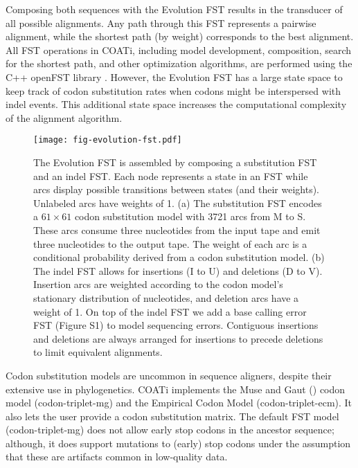 Composing both sequences with the Evolution FST results in the transducer of all possible alignments.
Any path through this FST represents a pairwise alignment, while the shortest path (by weight) corresponds to the best alignment.
All FST operations in COATi, including model development, composition, search for the shortest path, and other optimization algorithms, are performed using the C++ openFST library .
However, the Evolution FST has a large state space to keep track of codon substitution rates when codons might be interspersed with indel events. This additional state space increases the computational complexity of the alignment algorithm.

\begin{figure}[h!]
\centering
\texttt{[image: fig-evolution-fst.pdf]}
\par
\caption{The Evolution FST is assembled by composing a substitution FST and an indel FST.
Each node represents a state in an FST while arcs display possible transitions between states (and their weights). Unlabeled arcs have weights of 1.
(a) The substitution FST encodes a $61 \times 61 $ codon substitution model with 3721 arcs from M to S. These arcs consume three nucleotides from the input tape and emit three nucleotides to the output tape. The weight of each arc is a conditional probability derived from a codon substitution model.
(b) The indel FST allows for insertions (I to U) and deletions (D to V). Insertion arcs are weighted according to the codon model's stationary distribution of nucleotides, and deletion arcs have a weight of 1. On top of the indel FST we add a base calling error FST (Figure S1) to model sequencing errors. Contiguous insertions and deletions are always arranged for insertions to precede deletions to limit equivalent alignments.}
\label{fig:evolution-fst}
\end{figure}

Codon substitution models are uncommon in sequence aligners, despite their extensive use in phylogenetics.
COATi implements the Muse and Gaut (\citeyear{muse_gaut_1994}) codon model (codon-triplet-mg) and the Empirical Codon Model  (codon-triplet-ecm).
It also lets the user provide a codon substitution matrix.
The default FST model (codon-triplet-mg) does not allow early stop codons in the ancestor sequence; although, it does support mutations to (early) stop codons under the assumption that these are artifacts common in low-quality data.

